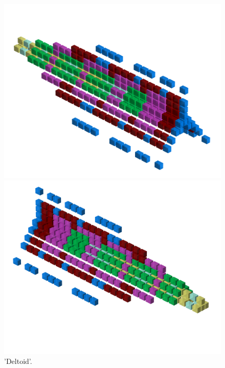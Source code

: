 \begin{figure}[H]
    \centering
    \begin{adjustbox}{width=12cm,center}
      \includegraphics[width=12cm]{src/patterns/pattern4-45.png}%
    \end{adjustbox}
    \begin{adjustbox}{width=12cm,margin=0cm -4cm}
      \includegraphics[width=12cm]{src/patterns/pattern4-225.png}%
    \end{adjustbox}
\caption{'Deltoid'.}
\end{figure}
\clearpage

